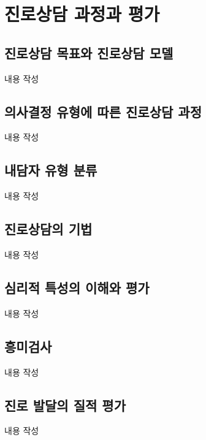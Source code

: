 \section{진로상담 과정과 평가}

\subsection{진로상담 목표와 진로상담 모델}
내용 작성

\subsection{의사결정 유형에 따른 진로상담 과정}
내용 작성

\subsection{내담자 유형 분류}
내용 작성

\subsection{진로상담의 기법}
내용 작성

\subsection{심리적 특성의 이해와 평가}
내용 작성

\subsection{흥미검사}
내용 작성

\subsection{진로 발달의 질적 평가}
내용 작성
